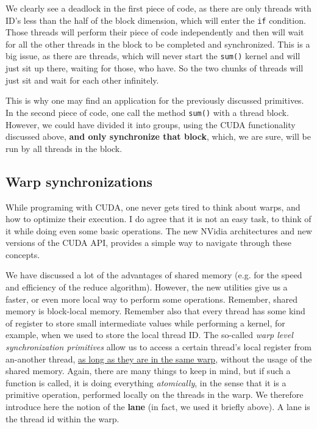 We clearly see a deadlock in the first piece of code, as 
there are only threads with ID's less than the half of the block dimension, which will 
enter the \verb|if| condition. Those threads will perform their piece of code independently 
and then will wait for all the other threads in the block to be completed and 
synchronized. This is a big issue, as there are threads, which will never start the \verb|sum()|
kernel and will just sit up there, waiting for those, who have. So the two chunks of threads
will just sit and wait for each other infinitely.

This is why one may find an application for the previously discussed primitives. 
In the second piece of code, one call the method \verb|sum()| with a thread block. However, 
we could have divided it into groups, using the CUDA functionality discussed above, 
\textbf{and only synchronize that block}, which, we are sure, will be run by all threads in 
the block. 

\subsection*{Warp synchronizations}
While programing with CUDA, one never gets tired to think about warps, and 
how to optimize their execution. I do agree that it is not an easy task, to think of it 
while doing even some basic operations. The new NVidia architectures and new versions of the
CUDA API, provides a simple way to navigate through these concepts.

We have discussed a lot of the advantages of shared memory (e.g. for the speed and efficiency
of the reduce algorithm). However, the new utilities give us a faster, or even more
local way to perform some operations. Remember, shared memory is block-local memory. 
Remember also that every thread has some kind of register to store small intermediate 
values while performing a kernel, for example, when
we used to store the local thread ID. 
The so-called \textit{warp level synchronization primitives}
allow us to access a certain thread's local register from an-another thread,
\underline{as long as they are in the same warp}, without 
the usage of the shared memory. Again, there are many things to keep in mind, 
but if such a function is called, it is doing everything \textit{atomically}, 
in the sense that it is a primitive operation, performed locally on the threads in the 
warp. We therefore introduce here the notion of the 
\textbf{lane} (in fact, we used it briefly above). A lane is the thread id within the warp.


